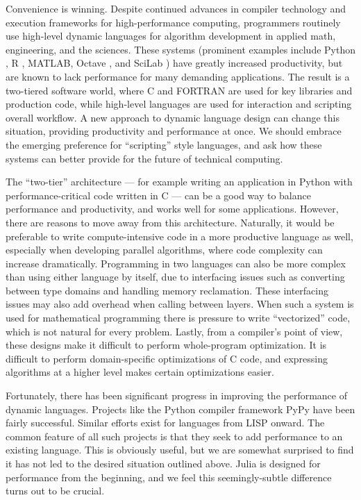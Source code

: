 \documentclass[9pt]{sigplanconf}
\begin{document}
Convenience is winning. Despite continued advances in compiler technology
and execution frameworks for high-performance computing, programmers
routinely use high-level dynamic languages for algorithm
development in applied math, engineering,  and the sciences. These systems
(prominent examples include Python \cite{numpy}, R \cite{Rlang},
MATLAB\textregistered, Octave \cite{Octave}, and SciLab \cite{scilab})
have greatly increased
productivity, but are known to lack performance for many demanding applications.
The result is a two-tiered software world, where
C and FORTRAN are used for key libraries and production code, while
high-level languages are used for interaction and scripting overall workflow.
A new approach to dynamic language design can
change this situation, providing productivity and performance at once. We
should embrace the emerging preference for ``scripting'' style languages,
and ask how these systems can better provide for the future of technical
computing.

The ``two-tier'' architecture --- for example writing an application in
Python with performance-critical code written in C --- can be a good
way to balance performance and productivity, and works well for some
applications. However, there are
reasons to move away from this architecture.
Naturally, it would be preferable to
write compute-intensive code in a more productive language as well,
especially when developing parallel algorithms, where code complexity
can increase dramatically.  Programming in two languages can also be
more complex than using either language by itself, due to interfacing
issues such as converting between type domains and handling memory
reclamation.  These interfacing issues may also add overhead when
calling between layers. When such a system is used for mathematical
programming there is pressure to write ``vectorized'' code, which is
not natural for every problem. Lastly, from a compiler's point of
view, these designs make it difficult to perform whole-program
optimization. It is difficult to perform domain-specific optimizations
of C code, and expressing algorithms at a higher level makes certain
optimizations easier.

Fortunately, there has been significant progress in improving the
performance of dynamic languages. Projects like the Python compiler
framework PyPy \cite{pypyjit} have been fairly successful. Similar efforts
exist for languages from LISP onward. The common feature of all
such projects is that they seek to add performance to an existing
language. This is obviously useful, but we are somewhat surprised to find
it has not led to the desired situation outlined above. Julia is designed
for performance from the beginning, and we feel this
seemingly-subtle difference turns out to be crucial.
\end{document}
